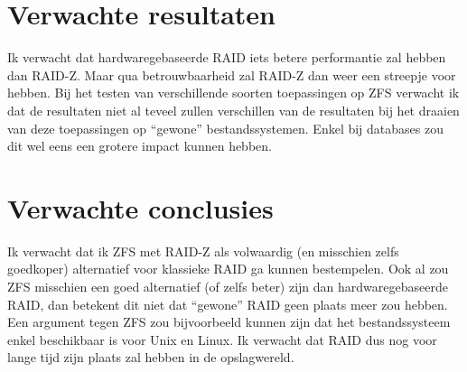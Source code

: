 \documentclass[fleqn,10pt]{voorstel}
\begin{document}
\section{Verwachte resultaten}
\label{sec:verwachte_resultaten}


Ik verwacht dat hardwaregebaseerde RAID iets betere performantie zal hebben dan RAID-Z. Maar qua betrouwbaarheid zal RAID-Z dan weer een streepje voor hebben. Bij het testen van verschillende soorten toepassingen op ZFS verwacht ik dat de resultaten niet al teveel zullen verschillen van de resultaten bij het draaien van deze toepassingen op ``gewone'' bestandssystemen. Enkel bij databases zou dit wel eens een grotere impact kunnen hebben.

\section{Verwachte conclusies}
\label{sec:verwachte_conclusies}


Ik verwacht dat ik ZFS met RAID-Z als volwaardig (en misschien zelfs goedkoper) alternatief voor klassieke RAID ga kunnen bestempelen. Ook al zou ZFS misschien een goed alternatief (of zelfs beter) zijn dan hardwaregebaseerde RAID, dan betekent dit niet dat ``gewone'' RAID geen plaats meer zou hebben. Een argument tegen ZFS zou bijvoorbeeld kunnen zijn dat het bestandssysteem enkel beschikbaar is voor Unix en Linux. Ik verwacht dat RAID dus nog voor lange tijd zijn plaats zal hebben in de opslagwereld. 


\printbibliography[heading=bibintoc]
\end{document}
